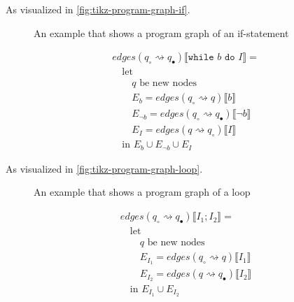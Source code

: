 As visualized in \autoref{fig:tikz-program-graph-if}.

\begin{figure}[htb!]
    \center
    
    \caption{An example that shows a program graph of an if-statement}
    \label{fig:tikz-program-graph-if}
\end{figure}

\begin{equation}
\begin{aligned}
    &edges(q_\circ \rightsquigarrow q_\bullet) \llbracket \texttt{while } b \texttt{ do } I \rrbracket = \\
    &\quad \text{let } \\
    &\quad\quad q \text{ be new nodes} \\
    &\quad\quad E_{b} = edges(q_\circ \rightsquigarrow q) \llbracket b \rrbracket \\
    &\quad\quad E_{\neg b} = edges(q_\circ \rightsquigarrow q_\bullet) \llbracket \neg b \rrbracket \\
    &\quad\quad E_{I} = edges(q \rightsquigarrow q_\circ) \llbracket I \rrbracket \\
    &\quad \text{in } E_{b} \cup E_{\neg b} \cup E_{I}
\end{aligned}
\end{equation}

As visualized in \autoref{fig:tikz-program-graph-loop}.

\begin{figure}[htb!]
    \center
    
    \caption{An example that shows a program graph of a loop}
    \label{fig:tikz-program-graph-loop}
\end{figure}

\begin{equation}
\begin{aligned}
    &edges(q_\circ \rightsquigarrow q_\bullet) \llbracket I_1; I_2 \rrbracket = \\
    &\quad \text{let } \\
    &\quad\quad q \text{ be new nodes} \\
    &\quad\quad E_{I_1} = edges(q_\circ \rightsquigarrow q) \llbracket I_1 \rrbracket \\
    &\quad\quad E_{I_2} = edges(q \rightsquigarrow q_\bullet) \llbracket I_2 \rrbracket \\
    &\quad \text{in } E_{I_1} \cup E_{I_2}
\end{aligned}
\end{equation}

